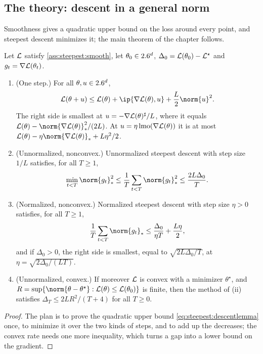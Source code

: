 \begin{refsection}
\section{The theory: descent in a general norm}\label{sec:steepest:descent}

Smoothness gives a quadratic upper bound on the loss around every point, and steepest descent minimizes it; the main theorem of the chapter follows.

\begin{theorem}\label{thm:steepest:descent}
Let $\mathcal{L}$ satisfy \cref{ass:steepest:smooth}, let $\theta_0\in2.6^d$, $\Delta_0=\mathcal{L}(\theta_0)-\mathcal{L}^\star$ and $g_t=\nabla\mathcal{L}(\theta_t)$.
\begin{enumerate}
\item (One step.) For all $\theta,u\in2.6^d$,
\begin{equation}\label{eq:steepest:descentlemma}
  \Loss(\theta+u)\le\Loss(\theta)+\ip{\nabla\Loss(\theta),u}+\frac L2\norm{u}^2 .
\end{equation}
The right side is smallest at $u=-\nabla\mathcal{L}(\theta)^\sharp/L$, where it equals $\Loss(\theta)-\norm{\nabla\Loss(\theta)}_*^2/(2L)$. At $u=\eta\operatorname{lmo}(\nabla\mathcal{L}(\theta))$ it is at most $\Loss(\theta)-\eta\norm{\nabla\Loss(\theta)}_*+L\eta^2/2$.
\item (Unnormalized, nonconvex.) Unnormalized steepest descent with step size $1/L$ satisfies, for all $T\ge1$,
\[
  \min_{t<T}\norm{g_t}_*^2\le\frac1T\sum_{t<T}\norm{g_t}_*^2\le\frac{2L\Delta_0}{T}.
\]
\item (Normalized, nonconvex.) Normalized steepest descent with step size $\eta>0$ satisfies, for all $T\ge1$,
\begin{equation}\label{eq:steepest:normalized}
  \frac1T\sum_{t<T}\norm{g_t}_*\le\frac{\Delta_0}{\eta T}+\frac{L\eta}2 ,
\end{equation}
and if $\Delta_0>0$, the right side is smallest, equal to $\sqrt{2L\Delta_0/T}$, at $\eta=\sqrt{2\Delta_0/(LT)}$.
\item (Unnormalized, convex.) If moreover $\mathcal{L}$ is convex with a minimizer $\theta^\star$, and $R=\sup\{\norm{\theta-\theta^\star}:\Loss(\theta)\le\Loss(\theta_0)\}$ is finite, then the method of (ii) satisfies $\Delta_T\le2LR^2/(T+4)$ for all $T\ge0$.
\end{enumerate}
\end{theorem}

\begin{proof}
The plan is to prove the quadratic upper bound \eqref{eq:steepest:descentlemma} once, to minimize it over the two kinds of steps, and to add up the decreases; the convex rate needs one more inequality, which turns a gap into a lower bound on the gradient.


\end{proof}
\end{refsection}
